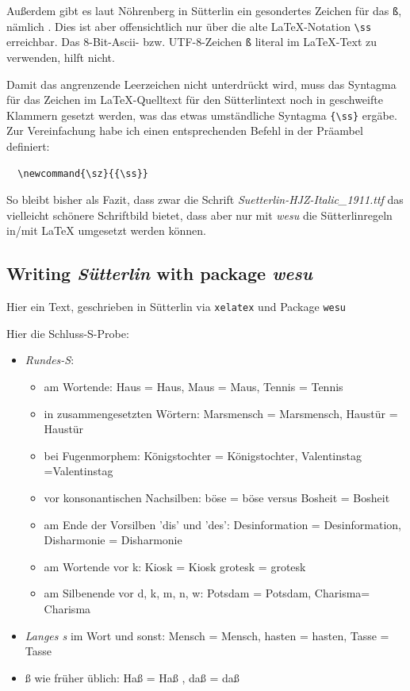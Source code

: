 \documentclass[
  DIV=calc,
  BCOR=5mm,
  11pt,
  headings=small,
  oneside,
  abstract=true,
  toc=bib,
  english,ngerman]{scrartcl}
\newcommand{\sz}{{\ss}}
\begin{document}
Außerdem gibt es laut Nöhrenberg in Sütterlin ein gesondertes Zeichen für das \texttt{ß}, nämlich {\wesu {\ss}}. Dies ist aber offensichtlich nur über die alte \LaTeX-Notation \texttt{\textbackslash ss} erreichbar. Das 8-Bit-Ascii- bzw. UTF-8-Zeichen \texttt{ß} literal im \LaTeX-Text zu verwenden, hilft nicht.

Damit das angrenzende Leerzeichen nicht unterdrückt wird, muss das Syntagma für das Zeichen {\wesu {\ss}} im \LaTeX-Quelltext für den Sütterlintext noch in geschweifte Klammern gesetzt werden, was das etwas umständliche Syntagma \texttt{\{\textbackslash ss\}} ergäbe. Zur Vereinfachung habe ich einen entsprechenden Befehl in der Präambel definiert:

\begin{verbatim}
  \newcommand{\sz}{{\ss}}
\end{verbatim}

So bleibt bisher als Fazit, dass zwar die Schrift \textit{Suetterlin-HJZ-Italic\_1911.ttf} das vielleicht schönere Schriftbild bietet, dass aber nur mit \textit{wesu} die Sütterlinregeln in/mit {\LaTeX} umgesetzt werden können.

\subsection{Writing \textit{Sütterlin} with package \textit{wesu}}

{\wesu Hier ein Text, geschrieben in Sütterlin via \texttt{xelatex} und Package \texttt{wesu}}

Hier die Schluss-S-Probe:

\begin{itemize}
  \item \textit{Rundes-S}:
  \begin{itemize}
    \item[\faCheck] am Wortende: Haus = {\wesu Haus}, Maus = {\wesu Maus}, Tennis = {\wesu Tennis} 
    \item[\faCheck] in zusammengesetzten Wörtern: Marsmensch = {\wesu Mars\-mensch}, Haustür = {\wesu Haus\-tür} 
    \item[\faCheck] bei Fugenmorphem: Königstochter = {\wesu Königs\-tochter}, Valentinstag ={\wesu Valentins\-tag} 
    \item[\faCheck] vor konsonantischen Nachsilben: böse = {\wesu böse} versus Bos\-heit = {\wesu Bosheit} 
    \item[\faCheck] am Ende der Vorsilben 'dis' und 'des': Desinformation = {\wesu Des\-information}, Disharmonie = {\wesu Dis\-harmonie} 
    \item[\faCheck] am Wortende vor k: Kiosk = {\wesu Kios\-k} grotesk = {\wesu grotes\-k} 
    \item[\faCheck] am Silbenende vor d, k, m, n, w: Potsdam = {\wesu Pots\-dam}, Charisma= {\wesu Charis\-ma}
  \end{itemize}
  \item[\faCheck] \textit{Langes s} im Wort und sonst: Mensch = {\wesu Mensch}, hasten = {\wesu hasten}, Tasse = {\wesu Tasse} 
  \item[\faCheck] ß wie früher üblich: Haß = {\wesu Ha\ss} , daß = {\wesu da\ss} 
\end{itemize}
\end{document}
